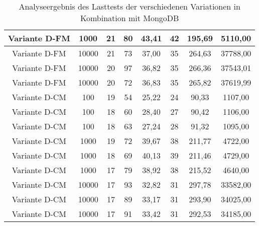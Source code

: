 \begin{landscape}
\begin{table}[h!]
\begin{tabular}{ |c|c|c|c|c|c|c|c|}
		\hline
		Variante D-FM & 1000 & 21 & 80 & 43,41 & 42 & 195,69 & 5110,00 \\
		\hline
		Variante D-FM & 10000 & 21 & 73 & 37,00 & 35 & 264,63 & 37788,00 \\
		\hline
		Variante D-FM & 10000 & 20 & 97 & 36,82 & 35 & 266,36 & 37543,01 \\
		\hline
		Variante D-FM & 10000 & 20 & 72 & 36,83 & 35 & 265,82 & 37619,99 \\
		\hline
		Variante D-CM & 100 & 19 & 54 & 25,22 & 24 & 90,33 & 1107,00 \\
		\hline
		Variante D-CM & 100 & 18 & 60 & 28,40 & 27 & 90,42 & 1106,00 \\
		\hline
		Variante D-CM & 100 & 18 & 63 & 27,24 & 28 & 91,32 & 1095,00 \\
		\hline
		Variante D-CM & 1000 & 19 & 72 & 39,67 & 38 & 211,77 & 4722,00 \\
		\hline
		Variante D-CM & 1000 & 18 & 69 & 40,13 & 39 & 211,46 & 4729,00 \\
		\hline
		Variante D-CM & 1000 & 17 & 79 & 38,92 & 38 & 215,52 & 4640,00 \\
		\hline
		Variante D-CM & 10000 & 17 & 93 & 32,82 & 31 & 297,78 & 33582,00 \\
		\hline
		Variante D-CM & 10000 & 17 & 89 & 33,17 & 31 & 293,90 & 34025,00 \\
		\hline
		Variante D-CM & 10000 & 17 & 91 & 33,42 & 31 & 292,53 & 34185,00 \\
		\hline
	\end{tabular}
	\caption{Analyseergebnis des Lasttests der verschiedenen Variationen in Kombination mit MongoDB}
	\label{fig:performance-mongo}
\end{table}
\end{landscape}


